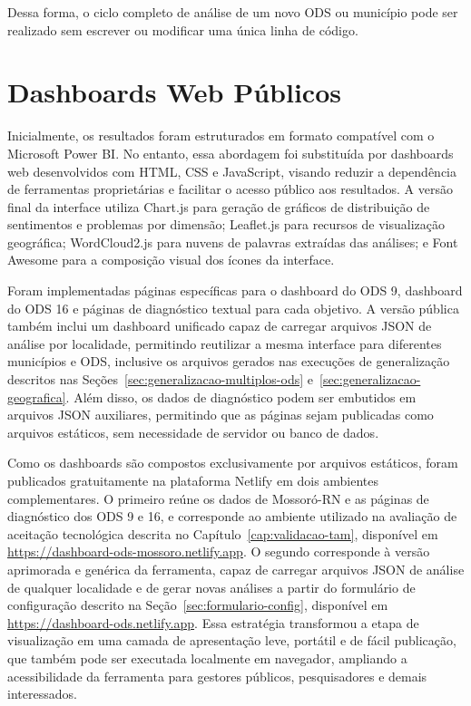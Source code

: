 Dessa forma, o ciclo completo de análise de um novo ODS ou município pode ser realizado sem escrever ou modificar uma única linha de código.

\section{Dashboards Web Públicos}
\label{sec:dashboards-publicos}

Inicialmente, os resultados foram estruturados em formato compatível com o Microsoft Power BI. No entanto, essa abordagem foi substituída por dashboards web desenvolvidos com HTML, CSS e JavaScript, visando reduzir a dependência de ferramentas proprietárias e facilitar o acesso público aos resultados. A versão final da interface utiliza Chart.js para geração de gráficos de distribuição de sentimentos e problemas por dimensão; Leaflet.js para recursos de visualização geográfica; WordCloud2.js para nuvens de palavras extraídas das análises; e Font Awesome para a composição visual dos ícones da interface.

Foram implementadas páginas específicas para o dashboard do ODS 9, dashboard do ODS 16 e páginas de diagnóstico textual para cada objetivo. A versão pública também inclui um dashboard unificado capaz de carregar arquivos JSON de análise por localidade, permitindo reutilizar a mesma interface para diferentes municípios e ODS, inclusive os arquivos gerados nas execuções de generalização descritos nas Seções~\ref{sec:generalizacao-multiplos-ods} e~\ref{sec:generalizacao-geografica}. Além disso, os dados de diagnóstico podem ser embutidos em arquivos JSON auxiliares, permitindo que as páginas sejam publicadas como arquivos estáticos, sem necessidade de servidor ou banco de dados.

Como os dashboards são compostos exclusivamente por arquivos estáticos, foram publicados gratuitamente na plataforma Netlify em dois ambientes complementares. O primeiro reúne os dados de Mossoró-RN e as páginas de diagnóstico dos ODS 9 e 16, e corresponde ao ambiente utilizado na avaliação de aceitação tecnológica descrita no Capítulo~\ref{cap:validacao-tam}, disponível em \url{https://dashboard-ods-mossoro.netlify.app}. O segundo corresponde à versão aprimorada e genérica da ferramenta, capaz de carregar arquivos JSON de análise de qualquer localidade e de gerar novas análises a partir do formulário de configuração descrito na Seção~\ref{sec:formulario-config}, disponível em \url{https://dashboard-ods.netlify.app}. Essa estratégia transformou a etapa de visualização em uma camada de apresentação leve, portátil e de fácil publicação, que também pode ser executada localmente em navegador, ampliando a acessibilidade da ferramenta para gestores públicos, pesquisadores e demais interessados.
